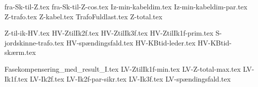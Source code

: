 \usepackage[utf8]{inputenc}%
\usepackage{amsmath}%
\usepackage{mathtools}%
\usepackage{icomma}%
\usepackage{siunitx}%
\usepackage{fp}%
\usepackage{xstring}%
\usepackage{listofitems}
\usepackage{ifthen}
\usepackage{gensymb} %

{fra-Sk-til-Z.tex}
{fra-Sk-til-Z-cos.tex}
{Iz-min-kabeldim.tex}
{Iz-min-kabeldim-par.tex}
{Z-trafo.tex}
{Z-kabel.tex}
{TrafoFuldlast.tex}
{Z-total.tex}

{Z-til-ik-HV.tex}
{HV-ZtilIk2f.tex}
{HV-ZtilIk3f.tex}
{HV-ZtilIk1f-prim.tex}
{S-jordskinne-trafo.tex}
{HV-spændingsfald.tex}
{HV-KBtid-leder.tex}
{HV-KBtid-skærm.tex}

{Fasekompensering_med_result_I.tex}
{LV-ZtilIk1f-min.tex}
{LV-Z-total-max.tex}
{LV-Ik1f.tex}
{LV-Ik2f.tex}
{LV-Ik2f-par-sikr.tex}
{LV-Ik3f.tex}
{LV-spændingsfald.tex}